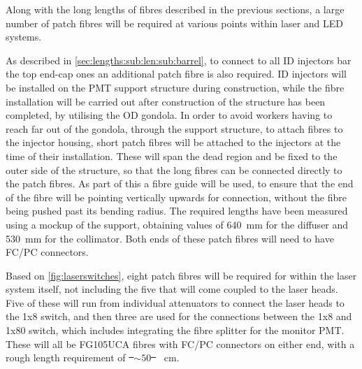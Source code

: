\documentclass[a4paper,11pt]{article}
\let\oldsim\sim
\renewcommand{\sim}{{\oldsim}}
\providecommand{\DIFaddtex}[1]{{\protect\color{blue}\uwave{#1}}} %
\providecommand{\DIFdeltex}[1]{{\protect\color{red}\sout{#1}}}                      %
\providecommand{\DIFaddbegin}{} %
\providecommand{\DIFaddend}{} %
\providecommand{\DIFdelbegin}{} %
\providecommand{\DIFdelend}{} %
\providecommand{\DIFadd}[1]{\texorpdfstring{\DIFaddtex{#1}}{#1}} %
\providecommand{\DIFdel}[1]{\texorpdfstring{\DIFdeltex{#1}}{}} %
\newcommand{\DIFscaledelfig}{0.5}
\newlength{\DIFdelgraphicswidth} %
\newlength{\DIFdelgraphicsheight} %
\newcommand{\DIFaddincludegraphics}[2][]{{\color{blue}\fbox{\DIFOincludegraphics[#1]{#2}}}} %
\newcommand{\DIFdelincludegraphics}[2][]{%
\sbox{\DIFdelgraphicsbox}{\DIFOincludegraphics[#1]{#2}}%
\settoboxwidth{\DIFdelgraphicswidth}{\DIFdelgraphicsbox} %
\settoboxtotalheight{\DIFdelgraphicsheight}{\DIFdelgraphicsbox} %
\scalebox{\DIFscaledelfig}{%
\parbox[b]{\DIFdelgraphicswidth}{\usebox{\DIFdelgraphicsbox}\\[-\baselineskip] \rule{\DIFdelgraphicswidth}{0em}}\llap{\resizebox{\DIFdelgraphicswidth}{\DIFdelgraphicsheight}{%
\setlength{\unitlength}{\DIFdelgraphicswidth}%
\begin{picture}(1,1)%
\thicklines\linethickness{2pt} %
{\color[rgb]{1,0,0}\put(0,0){\framebox(1,1){}}}%
{\color[rgb]{1,0,0}\put(0,0){\line( 1,1){1}}}%
{\color[rgb]{1,0,0}\put(0,1){\line(1,-1){1}}}%
\end{picture}%
}\hspace*{3pt}}} %
} %
\DeclareRobustCommand{\DIFaddbegin}{\DIFOaddbegin \let\includegraphics\DIFaddincludegraphics} %
\DeclareRobustCommand{\DIFaddend}{\DIFOaddend \let\includegraphics\DIFOincludegraphics} %
\DeclareRobustCommand{\DIFdelbegin}{\DIFOdelbegin \let\includegraphics\DIFdelincludegraphics} %
\DeclareRobustCommand{\DIFdelend}{\DIFOaddend \let\includegraphics\DIFOincludegraphics} %
\begin{document}
Along with the long lengths of fibres described in the previous sections, a large number of patch fibres will be required at various points within laser and LED systems.

As described in \cref{sec:lengths:sub:len:sub:barrel}, to connect to all ID injectors bar the top end-cap ones an additional patch fibre is also required. ID injectors will be installed on the PMT support structure during construction, while the fibre installation will be carried out after construction of the structure has been completed, by utilising the OD gondola. In order to avoid workers having to reach far out of the gondola, through the support structure, to attach fibres to the injector housing, short patch fibres will be attached to the injectors at the time of their installation. These will span the dead region and be fixed to the outer side of the structure, so that the long fibres can be connected directly to the patch fibres. As part of this a fibre guide will be used, to ensure that the end of the fibre will be pointing vertically upwards for connection, without the fibre being pushed past its bending radius. The required lengths have been measured using a mockup of the support, obtaining values of 640~mm for the diffuser and 530~mm for the collimator. Both ends of these patch fibres will need to have FC/PC connectors.

Based on \cref{fig:laserswitches}, eight patch fibres will be required for within the laser system itself, not including the five that will come coupled to the laser heads. Five of these will run from individual attenuators to connect the laser heads to the 1x8 switch, and then three are used for the connections between the 1x8 and 1x80 switch, which includes integrating the fibre splitter for the monitor PMT. These will all be FG105UCA fibres with FC/PC connectors on either end, with a rough length requirement of \DIFdelbegin \DIFdel{\mbox{%
$\sim50$
}%
}\DIFdelend \DIFaddbegin \DIFadd{\mbox{%
$\sim100$
}%
}\DIFaddend ~cm.
\end{document}
